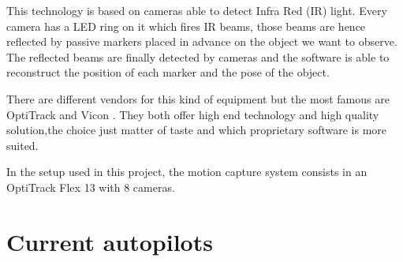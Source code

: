 \noindent
This technology is based on cameras able to detect Infra Red (IR) light. Every camera has a LED ring on it which fires IR beams, those beams are hence reflected by passive markers placed in advance on the object we want to observe. The reflected beams are finally detected by cameras and the software is able to reconstruct the position of each marker and the pose of the object.\par
There are different vendors for this kind of equipment but the most famous are OptiTrack \cite{OptiT} and Vicon \cite{vicon}. They both offer high end technology and high quality solution,the choice just matter of taste and which proprietary software is more suited.\par In the setup used in this project, the motion capture system consists in an OptiTrack Flex 13 with 8 cameras.


\section{Current autopilots}

